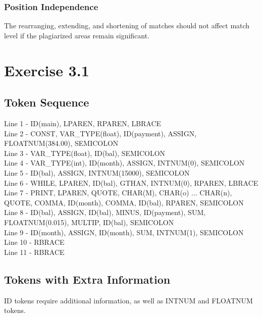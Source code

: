 \documentclass[letterpaper, 10pt,DIV=13]{scrartcl}
\numberwithin{equation}{section} %
\numberwithin{figure}{section} %
\numberwithin{table}{section} %
\begin{document}
\subsubsection{Position Independence}
The rearranging, extending, and shortening of matches should not affect match level if the plagiarized areas remain significant.


\section{Exercise 3.1}

\subsection{Token Sequence}
Line 1 - ID(main), LPAREN, RPAREN, LBRACE \\  
Line 2 - CONST, VAR\_TYPE(float), ID(payment), ASSIGN, FLOATNUM(384.00), SEMICOLON \\ 
Line 3 - VAR\_TYPE(float), ID(bal), SEMICOLON \\
Line 4 - VAR\_TYPE(int), ID(month), ASSIGN, INTNUM(0), SEMICOLON\\
Line 5 - ID(bal), ASSIGN, INTNUM(15000), SEMICOLON\\
Line 6 - WHILE, LPAREN, ID(bal), GTHAN, INTNUM(0), RPAREN, LBRACE\\
Line 7 - PRINT, LPAREN, QUOTE, CHAR(M), CHAR(o) ... CHAR(n), QUOTE, COMMA, ID(month), COMMA, ID(bal), RPAREN, SEMICOLON\\
Line 8 - ID(bal), ASSIGN, ID(bal), MINUS, ID(payment), SUM, FLOATNUM(0.015), MULTIP, ID(bal), SEMICOLON\\
Line 9 - ID(month), ASSIGN, ID(month), SUM, INTNUM(1), SEMICOLON\\
Line 10 - RBRACE\\
Line 11 - RBRACE\\

\subsection{Tokens with Extra Information}
ID tokens require additional information, as well as INTNUM and FLOATNUM tokens.
\end{document}
